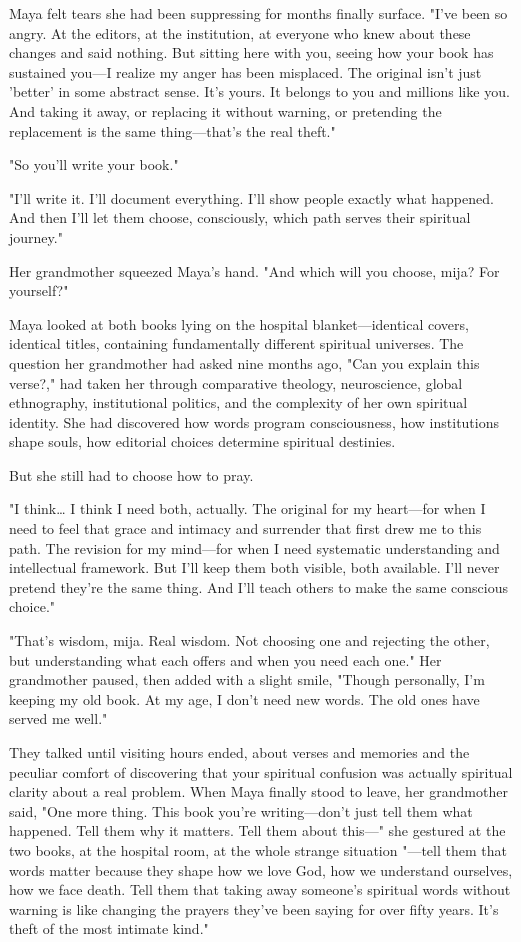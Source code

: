 \documentclass[12pt,twoside]{book}
\begin{document}
Maya felt tears she had been suppressing for months finally surface. "I've been so angry. At the editors, at the institution, at everyone who knew about these changes and said nothing. But sitting here with you, seeing how your book has sustained you—I realize my anger has been misplaced. The original isn't just 'better' in some abstract sense. It's yours. It belongs to you and millions like you. And taking it away, or replacing it without warning, or pretending the replacement is the same thing—that's the real theft."

"So you'll write your book."

"I'll write it. I'll document everything. I'll show people exactly what happened. And then I'll let them choose, consciously, which path serves their spiritual journey."

Her grandmother squeezed Maya's hand. "And which will you choose, mija? For yourself?"

Maya looked at both books lying on the hospital blanket—identical covers, identical titles, containing fundamentally different spiritual universes. The question her grandmother had asked nine months ago, "Can you explain this verse?," had taken her through comparative theology, neuroscience, global ethnography, institutional politics, and the complexity of her own spiritual identity. She had discovered how words program consciousness, how institutions shape souls, how editorial choices determine spiritual destinies.

But she still had to choose how to pray.

"I think\ldots{} I think I need both, actually. The original for my heart—for when I need to feel that grace and intimacy and surrender that first drew me to this path. The revision for my mind—for when I need systematic understanding and intellectual framework. But I'll keep them both visible, both available. I'll never pretend they're the same thing. And I'll teach others to make the same conscious choice."

"That's wisdom, mija. Real wisdom. Not choosing one and rejecting the other, but understanding what each offers and when you need each one." Her grandmother paused, then added with a slight smile, "Though personally, I'm keeping my old book. At my age, I don't need new words. The old ones have served me well."

They talked until visiting hours ended, about verses and memories and the peculiar comfort of discovering that your spiritual confusion was actually spiritual clarity about a real problem. When Maya finally stood to leave, her grandmother said, "One more thing. This book you're writing—don't just tell them what happened. Tell them why it matters. Tell them about this—" she gestured at the two books, at the hospital room, at the whole strange situation "—tell them that words matter because they shape how we love God, how we understand ourselves, how we face death. Tell them that taking away someone's spiritual words without warning is like changing the prayers they've been saying for over fifty years. It's theft of the most intimate kind."
\end{document}
